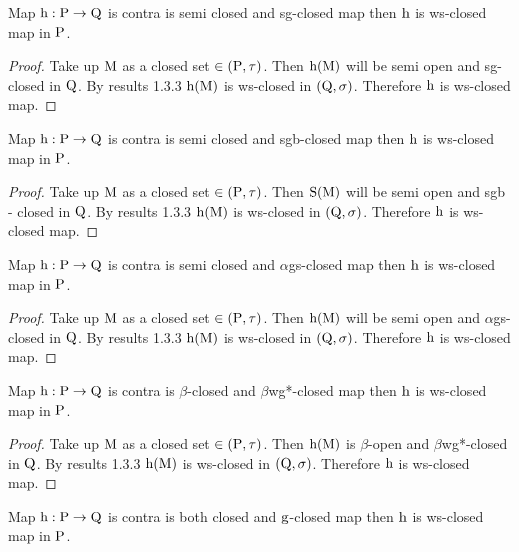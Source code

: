 \begin{thm}\label{thm4.2.21}
Map $\mathrm{h}: \mathrm{P} \to \mathrm{Q}$ is contra is semi closed and sg-closed map then $\mathrm{h}$ is ws-closed map in $\mathrm{P}$.
\end{thm}

\begin{proof}
Take up $\mathrm{M}$ as a closed set $\in(\mathrm{P}, \tau)$. Then $\mathrm{h} (\mathrm{M})$ will be semi open and sg-closed in $\mathrm{Q}$. By results 1.3.3 $\mathrm{h} (\mathrm{M})$ is ws-closed in $(\mathrm{Q}, \sigma)$. Therefore $\mathrm{h}$ is ws-closed map.
\end{proof}

\begin{thm}\label{thm4.2.22}
Map $\mathrm{h}: \mathrm{P} \to \mathrm{Q}$ is contra is semi closed and sgb-closed map then $\mathrm{h}$ is ws-closed map in $\mathrm{P}$.
\end{thm}

\begin{proof}
Take up $\mathrm{M}$ as a closed set $\in (\mathrm{P}, \tau)$. Then $\mathrm{S} (\mathrm{M})$ will be semi open and sgb - closed in $\mathrm{Q}$. By results 1.3.3 $\mathrm{h} (\mathrm{M})$ is ws-closed in $(\mathrm{Q}, \sigma)$. Therefore $\mathrm{h}$ is ws-closed map.
\end{proof}

\begin{thm}\label{thm4.2.23}
Map $\mathrm{h}: \mathrm{P} \to \mathrm{Q}$ is contra is semi closed and $\alpha$gs-closed map then $\mathrm{h}$ is ws-closed map in $\mathrm{P}$.
\end{thm}

\begin{proof}
Take up $\mathrm{M}$ as a closed set $\in (\mathrm{P}, \tau)$. Then $\mathrm{h} (\mathrm{M})$ will be semi open and $\alpha$gs-closed in $\mathrm{Q}$. By results 1.3.3 $\mathrm{h} (\mathrm{M})$ is ws-closed in $(\mathrm{Q}, \sigma)$. Therefore $\mathrm{h}$ is ws-closed map.
\end{proof}

\begin{thm}\label{thm4.2.24}
Map $\mathrm{h}: \mathrm{P} \to \mathrm{Q}$ is contra is $\beta$-closed and $\beta$wg*-closed map then $\mathrm{h}$ is ws-closed map in $\mathrm{P}$.
\end{thm}

\begin{proof}
Take up $\mathrm{M}$ as a closed set $\in (\mathrm{P}, \tau)$. Then $\mathrm{h} (\mathrm{M})$ is $\beta$-open and $\beta$wg*-closed in $\mathrm{Q}$. By results 1.3.3 $\mathrm{h} (\mathrm{M})$ is ws-closed in $(\mathrm{Q}, \sigma)$. Therefore $\mathrm{h}$ is ws-closed map.
\end{proof}

\begin{thm}\label{thm4.2.25}
Map $\mathrm{h}: \mathrm{P} \to \mathrm{Q}$ is contra is both closed and $\mathrm{g}$-closed map then $\mathrm{h}$ is ws-closed map in $\mathrm{P}$.
\end{thm}

